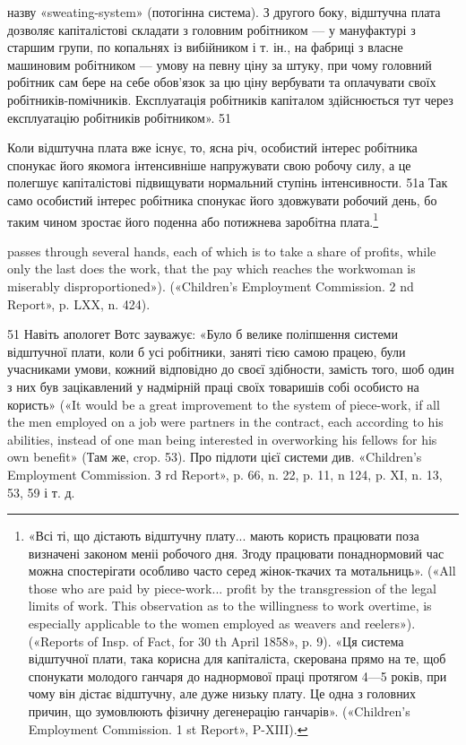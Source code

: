 назву «sweating-system» (потогінна система). З другого боку,
відштучна плата дозволяє капіталістові складати з головним робітником
— у мануфактурі з старшим групи, по копальнях із
вибійником і т. ін., на фабриці з власне машиновим робітником —
умову на певну ціну за штуку, при чому головний робітник сам
бере на себе обов’язок за цю ціну вербувати та оплачувати своїх
робітників-помічників. Експлуатація робітників капіталом здійснюється
тут через експлуатацію робітників робітником». 51

Коли відштучна плата вже існує, то, ясна річ, особистий інтерес
робітника спонукає його якомога інтенсивніше напружувати
свою робочу силу, а це полегшує капіталістові підвищувати нормальний
ступінь інтенсивности. 51а Так само особистий інтерес
робітника спонукає його здовжувати робочий день, бо таким
чином зростає його поденна або потижнева заробітна плата.\footnote{
«Всі ті, що дістають відштучну плату... мають користь працювати
поза визначені законом меніі робочого дня. Згоду працювати понаднормовий
час можна спостерігати особливо часто серед жінок-ткачих та мотальниць».
(«All those who are paid by piece-work... profit by the transgression
of the legal limits of work. This observation as to the willingness
to work overtime, is especially applicable to the women employed as weavers
and reelers»). («Reports of Insp. of Fact, for 30 th April 1858», p. 9).
«Ця система відштучної плати, така корисна для капіталіста, скерована
прямо на те, щоб спонукати молодого ганчаря до наднормової праці
протягом 4—5 років, при чому він дістає відштучну, але дуже низьку плату.
Це одна з головних причин, що зумовлюють фізичну дегенерацію ганчарів».
(«Children’s Employment Commission. 1 st Report», P-XIII).
}

passes through several hands, each of which is to take a share of profits,
while only the last does the work, that the pay which reaches the workwoman
is miserably disproportioned»). («Children’s Employment Commission.
2 nd Report», p. LXX, n. 424).

51    Навіть апологет Вотс зауважує: «Було б велике поліпшення
системи відштучної плати, коли б усі робітники, заняті тією самою працею,
були учасниками умови, кожний відповідно до своєї здібности, замість
того, шоб один з них був зацікавлений у надмірній праці своїх
товаришів собі особисто на користь» («It would be a great improvement
to the system of piece-work, if all the men employed on a job were partners
in the contract, each according to his abilities, instead of one man
being interested in overworking his fellows for his own benefit» (Там же,
crop. 53). Про підлоти цієї системи див. «Children’s Employment Commission.
З rd Report», p. 66, n. 22, p. 11, n 124, p. XI, n. 13, 53, 59 і т. д.

